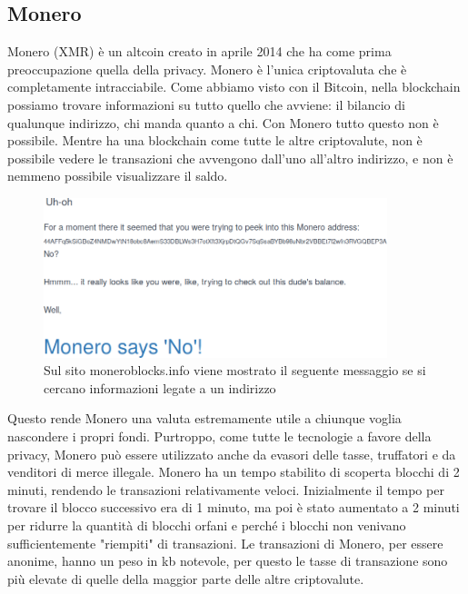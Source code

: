 \documentclass {article}
\begin{document}
\subsection {Monero}


Monero (XMR) è un altcoin creato in aprile 2014 che ha come prima preoccupazione quella della privacy. %
Monero è l'unica criptovaluta che è completamente intracciabile. Come abbiamo visto con il Bitcoin, nella blockchain possiamo trovare informazioni su tutto quello che avviene: il bilancio di qualunque indirizzo, chi manda quanto a chi.
Con Monero tutto questo non è possibile. Mentre ha una blockchain come tutte le altre criptovalute, non è possibile vedere le transazioni che avvengono dall'uno all'altro indirizzo, e non è nemmeno possibile visualizzare il saldo.

\vspace {0.5cm}
\begin{figure}[htb!]
\includegraphics [width = 10cm] {monero.png}
\centering
\caption {Sul sito moneroblocks.info viene mostrato il seguente messaggio se si cercano informazioni legate a un indirizzo}
\end{figure}
\vspace {0.2cm}
\noindent
%
Questo rende Monero una valuta estremamente utile a chiunque voglia nascondere i propri fondi.
Purtroppo, come tutte le tecnologie a favore della privacy, Monero può essere utilizzato anche da evasori delle tasse, truffatori e da venditori di merce illegale.
Monero ha un tempo stabilito di scoperta blocchi di 2 minuti, rendendo le transazioni relativamente veloci.
Inizialmente il tempo per trovare il blocco successivo era di 1 minuto, ma poi è stato aumentato a 2 minuti per ridurre la quantità di blocchi orfani e perché i blocchi non venivano sufficientemente "riempiti" di transazioni.
Le transazioni di Monero, per essere anonime, hanno un peso in kb notevole, per questo le tasse di transazione sono più elevate di quelle della maggior parte delle altre criptovalute. %
\end{document}
